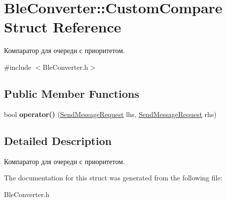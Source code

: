 \hypertarget{structBleConverter_1_1CustomCompare}{}\section{Ble\+Converter\+:\+:Custom\+Compare Struct Reference}
\label{structBleConverter_1_1CustomCompare}


Компаратор для очереди с приоритетом.  




{\ttfamily \#include $<$Ble\+Converter.\+h$>$}

\subsection*{Public Member Functions}
\begin{DoxyCompactItemize}
\item 
\mbox{\label{structBleConverter_1_1CustomCompare_aceaf9bbbc7e92e8467cc58c2e69573ba}} 
bool {\bfseries operator()} (\hyperlink{classSendMessageRequest}{Send\+Message\+Request} lhs, \hyperlink{classSendMessageRequest}{Send\+Message\+Request} rhs)
\end{DoxyCompactItemize}


\subsection{Detailed Description}
Компаратор для очереди с приоритетом. 

The documentation for this struct was generated from the following file\+:\begin{DoxyCompactItemize}
\item 
Ble\+Converter.\+h\end{DoxyCompactItemize}
